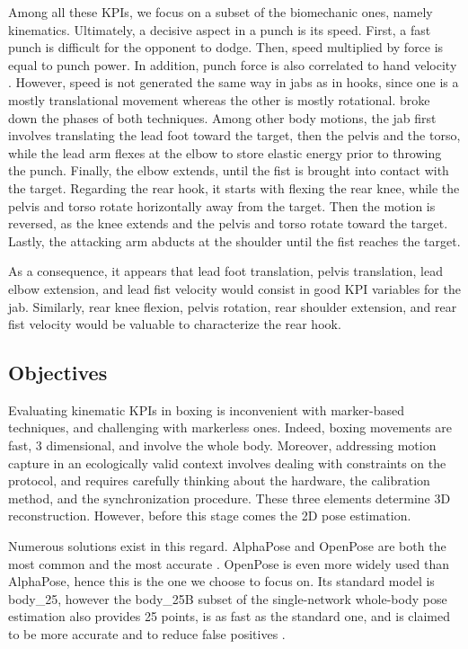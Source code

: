 Among all these KPIs, we focus on a subset of the biomechanic ones, namely kinematics. Ultimately, a decisive aspect in a punch is its speed. First, a fast punch is difficult for the opponent to dodge. Then, speed multiplied by force is equal to punch power. In addition, punch force is also correlated to hand velocity \cite{Mack2010}. However, speed is not generated the same way in jabs as in hooks, since one is a mostly translational movement whereas the other is mostly rotational. \cite{Lenetsky2020} broke down the phases of both techniques. Among other body motions, the jab first involves translating the lead foot toward the target, then the pelvis and the torso, while the lead arm flexes at the elbow to store elastic energy prior to throwing the punch. Finally, the elbow extends, until the fist is brought into contact with the target. Regarding the rear hook, it starts with flexing the rear knee, while the pelvis and torso rotate horizontally away from the target. Then the motion is reversed, as the knee extends and the pelvis and torso rotate toward the target. Lastly, the attacking arm abducts at the shoulder until the fist reaches the target. 

As a consequence, it appears that lead foot translation, pelvis translation, lead elbow extension, and lead fist velocity would consist in good KPI variables for the jab. Similarly, rear knee flexion, pelvis rotation, rear shoulder extension, and rear fist velocity would be valuable to characterize the rear hook. 


\subsection{Objectives}

Evaluating kinematic KPIs in boxing is inconvenient with marker-based techniques, and challenging with markerless ones. Indeed, boxing movements are fast, 3 dimensional, and involve the whole body. Moreover, addressing motion capture in an ecologically valid context involves dealing with constraints on the protocol, and requires carefully thinking about the hardware, the calibration method, and the synchronization procedure. These three elements determine 3D reconstruction. However, before this stage comes the 2D pose estimation. 

Numerous solutions exist in this regard. AlphaPose \cite{Fang2017} and OpenPose \cite{Cao2019} are both the most common and the most accurate \cite{Needham2021b,Mroz2021}. OpenPose is even more widely used than AlphaPose, hence this is the one we choose to focus on. Its standard model is body\_25, however the body\_25B subset of the single-network whole-body pose estimation \cite{Hidalgo2019} also provides 25 points, is as fast as the standard one, and is claimed to be more accurate and to reduce false positives \cite{Hidalgo2019,Pagnon2021}. 

